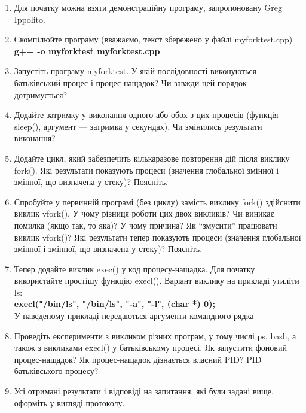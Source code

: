 \documentclass[a4paper,12pt]{article}
\begin{document}
    \begin{enumerate}
        \item Для початку можна взяти демонстраційну програму, запропоновану Greg Ippolito.
        \item Скомпілюйте програму (вважаємо, текст збережено у файлі myforktest.cpp) \\
        \textbf{g++ -o myforktest myforktest.cpp}
        \item Запустіть програму myforktest. У якій послідовності виконуються батьківський процес і процес-нащадок? Чи
        завжди цей порядок дотримується?
        \item Додайте затримку у виконання одного або обох з цих процесів (функція sleep(), аргумент — затримка у
        секундах). Чи змінились результати виконання?
        \item Додайте цикл, який забезпечить кількаразове повторення дій після виклику fork(). Які результати показують
        процеси (значення глобальної змінної і змінної, що визначена у стеку)? Поясніть.
        \item Спробуйте у первинній програмі (без циклу) замість виклику fork() здійснити виклик vfork(). У чому різниця
        роботи цих двох викликів? Чи виникає помилка (якщо так, то яка)? У чому причина? Як “змусити” працювати виклик
        vfork()? Які результати тепер показують процеси (значення глобальної змінної і змінної, що визначена у стеку)? Поясніть.
        \item Тепер додайте виклик exec() у код процесу-нащадка. Для початку використайте простішу функцію execl(). Варіант
        виклику на прикладі утиліти ls: \\
        \textbf{execl("/bin/ls", "/bin/ls", "-a", "-l", (char *) 0);} \\
        У наведеному прикладі передаються аргументи командного рядка
        \item Проведіть експерименти з викликом різних програм, у тому числі ps, bash, а також з викликами execl() у
        батьківському процесі. Як запустити фоновий процес-нащадок? Як процес-нащадок дізнається власний PID? PID батьківського процесу?
        \item Усі отримані результати і відповіді на запитання, які були задані вище, оформіть у вигляді протоколу.
    \end{enumerate}
\end{document}
